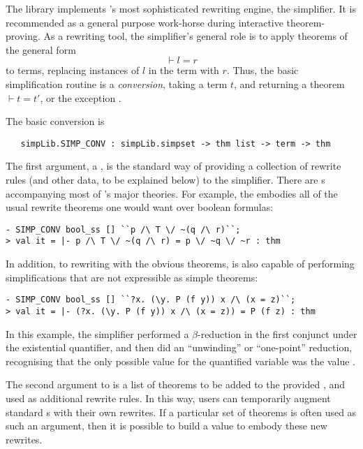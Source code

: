 The  library implements \HOL's most sophisticated rewriting
engine, the simplifier.  It is recommended as a general purpose
work-horse during interactive theorem-proving.  As a rewriting tool,
the simplifier's general role is to apply theorems of the general form
\[
\vdash l = r
\]
to terms, replacing instances of $l$ in the term with $r$. Thus, the
basic simplification routine is a \emph{conversion}, taking a term
$t$, and returning a theorem $\vdash t = t'$, or the exception
.

The basic conversion is
\begin{verbatim}
   simpLib.SIMP_CONV : simpLib.simpset -> thm list -> term -> thm
\end{verbatim}
The first argument, a \simpset, is the standard way of providing a
collection of rewrite rules (and other data, to be explained below) to
the simplifier.  There are \simpset{}s accompanying most of \HOL's
major theories.  For example, the \simpset{} 
embodies all of the usual rewrite theorems one would want over boolean
formulas:
\setcounter{sessioncount}{0}
\begin{session}
\begin{verbatim}
- SIMP_CONV bool_ss [] ``p /\ T \/ ~(q /\ r)``;
> val it = |- p /\ T \/ ~(q /\ r) = p \/ ~q \/ ~r : thm
\end{verbatim}
\end{session}
In addition, to rewriting with the obvious theorems,  is
also capable of performing simplifications that are not expressible as
simple theorems:
\begin{session}
\begin{verbatim}
- SIMP_CONV bool_ss [] ``?x. (\y. P (f y)) x /\ (x = z)``;
> val it = |- (?x. (\y. P (f y)) x /\ (x = z)) = P (f z) : thm
\end{verbatim}
\end{session}
In this example, the simplifier performed a $\beta$-reduction in the
first conjunct under the existential quantifier, and then did an
``unwinding'' or ``one-point'' reduction, recognising that the only
possible value for the quantified variable  was the value
.

The second argument to  is a list of theorems to be
added to the provided \simpset, and used as additional rewrite rules.
In this way, users can temporarily augment standard \simpset{}s with
their own rewrites.  If a particular set of theorems is often used as
such an argument, then it is possible to build a \simpset{} value to
embody these new rewrites.

